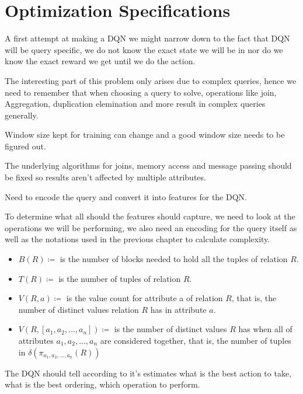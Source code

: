 \section{Optimization Specifications}
A first attempt at making a DQN we might narrow down to the fact that DQN will be query specific, we do not know the exact state we will be in nor do we know the exact reward we get until we do the action. 
\par The interesting part of this problem only arises due to complex queries, hence we need to remember that when choosing a query to solve, operations like join, Aggregation, duplication elemination and more result in complex queries generally.
\par Window size kept for training can change and a good window size needs to be figured out.
\par The underlying algorithms for joins, memory access and message passing should be fixed so results aren't affected by multiple attributes.
\par Need to encode the query and convert it into features for the DQN.
\par To determine what all should the features should capture, we need to look at the operations we will be performing, we also need an encoding for the query itself as well as the notations used in the previous chapter to calculate complexity.
\begin{itemize}
\item $B(R) \coloneqq$ is the number of blocks needed to hold all the tuples of relation $R$.
\item $T(R) \coloneqq$ is the number of tuples of relation $R$.
\item $V(R,a) \coloneqq$ is the value count for attribute a of relation $R$, that is, the number of distinct values relation $R$ has in attribute $a$.
\item $V(R, [ a_1 , a_2,..., a_n]) \coloneqq$ is the number of distinct values $R$ has when all of attributes $a_1, a_2,..., a_n$ are considered together, that is, the number of tuples in $\delta(\pi_{a_1,a_2,...,a_n}(R))$
\end{itemize}

\par The DQN should tell according to it's estimates what is the best action to take, what is the best ordering, which operation to perform.



% 

